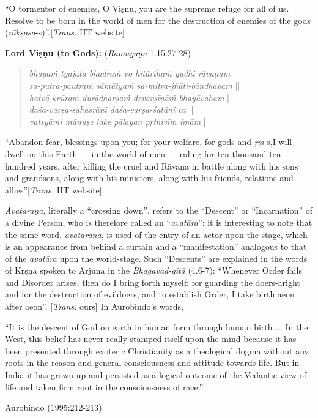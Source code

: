 \begin{myquote}
“O tormentor of enemies, O Viṣṇu, you are the supreme refuge for all of us. Resolve to be born in the world of men for the destruction of enemies of the gods ({\sl rākṣasa}-s)”.\hfill [{\sl Trans.} IIT website]
\end{myquote}

\smallskip
\textbf{Lord Viṣṇu (to Gods):} ({\sl Rāmāyaṇa} 1.15.27-28)\\[-20pt]

\begin{quote}
{{\sl bhayaṁ tyajata bhadraṁ vo hitārthaṁ yudhi rāvaṇam}} |\\
{\sl sa-putra-pautraṁ sāmātyaṁ sa-mitra-jñāti-bāndhavam} ||\\
{\sl hatvā krūraṁ durādharṣaṁ devarṣīṇāṁ bhayāvaham} |\\
{\sl daśa-varṣa-sahasrāṇi daśa-varṣa-śatāni ca} ||\\
{\sl vatsyāmi mānuṣe loke pālayan pṛthivīm imām} ||
\end{quote}

\newpage

\begin{myquote}
“Abandon fear, blessings upon you; for your welfare, for gods and {\sl ṛṣi}-s,\break I will dwell on this Earth --- in the world of men --- ruling for ten thousand ten hundred years, after killing the cruel and Rāvaṇa in battle along with his sons and grandsons, along with his ministers, along with his friends, relations and allies”\hfill [{\sl Trans.} IIT website]
\end{myquote}

{\sl Avataraṇa}, literally a “crossing down”, refers to the “Descent” or “Incarnation” of a divine Person, who is therefore called an “{\sl avatāra}”: it is interesting to note that the same word, {\sl avataraṇa}, is used of the entry of an actor upon the stage, which is an appearance from behind a curtain and a “manifestation” analogous to that of the {\sl avatāra} upon the world-stage. Such “Descents” are explained in the words of Kṛṣṇa spoken to Arjuna in the {\sl Bhagavad-gītā} (4.6-7): “Whenever Order fails and Disorder arises, then do I bring forth myself: for guarding the doers-aright and for the destruction of evildoers, and to establish Order, I take birth aeon after aeon”. [{\sl Trans.} ours] In Aurobindo’s words,  

\begin{myquote}
“It is the descent of God on earth in human form through human birth ... In the West, this belief has never really stamped itself upon the mind because it has been presented through exoteric Christianity as a theological dogma without any roots in the reason and general consciousness and attitude towards life. But in India it has grown up and persisted as a logical outcome of the Vedantic view of life and taken firm root in the consciousness of race.”	

\hfill Aurobindo (1995:212-213)
\end{myquote}


